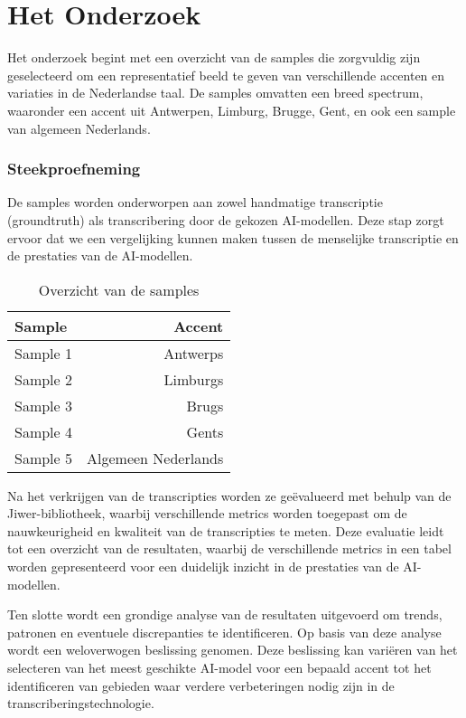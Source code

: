 
\chapter{Het Onderzoek}%
\label{ch:onderzoek}


Het onderzoek begint met een overzicht van de samples die zorgvuldig zijn geselecteerd om een representatief beeld te geven van verschillende accenten en variaties in de Nederlandse taal. De samples omvatten een breed spectrum, waaronder een accent uit Antwerpen, Limburg, Brugge, Gent, en ook een sample van algemeen Nederlands.
\subsection{Steekproefneming}
De samples worden onderworpen aan zowel handmatige transcriptie (groundtruth) als transcribering door de gekozen AI-modellen. Deze stap zorgt ervoor dat we een vergelijking kunnen maken tussen de menselijke transcriptie en de prestaties van de AI-modellen.

\begin{table}[htbp]
    \centering
    \caption{Overzicht van de samples}
    \label{tab:samples}
    \begin{tabular}{l||r}
        \hline
        \toprule
        Sample & Accent \\ \midrule
        Sample 1 & Antwerps \\
        Sample 2 & Limburgs \\
        Sample 3 & Brugs \\
        Sample 4 & Gents \\
        Sample 5 & Algemeen Nederlands \\ \bottomrule
    \end{tabular}
\end{table}


Na het verkrijgen van de transcripties worden ze geëvalueerd met behulp van de Jiwer-bibliotheek, waarbij verschillende metrics worden toegepast om de nauwkeurigheid en kwaliteit van de transcripties te meten. Deze evaluatie leidt tot een overzicht van de resultaten, waarbij de verschillende metrics in een tabel worden gepresenteerd voor een duidelijk inzicht in de prestaties van de AI-modellen.

Ten slotte wordt een grondige analyse van de resultaten uitgevoerd om trends, patronen en eventuele discrepanties te identificeren. Op basis van deze analyse wordt een weloverwogen beslissing genomen. Deze beslissing kan variëren van het selecteren van het meest geschikte AI-model voor een bepaald accent tot het identificeren van gebieden waar verdere verbeteringen nodig zijn in de transcriberingstechnologie.

